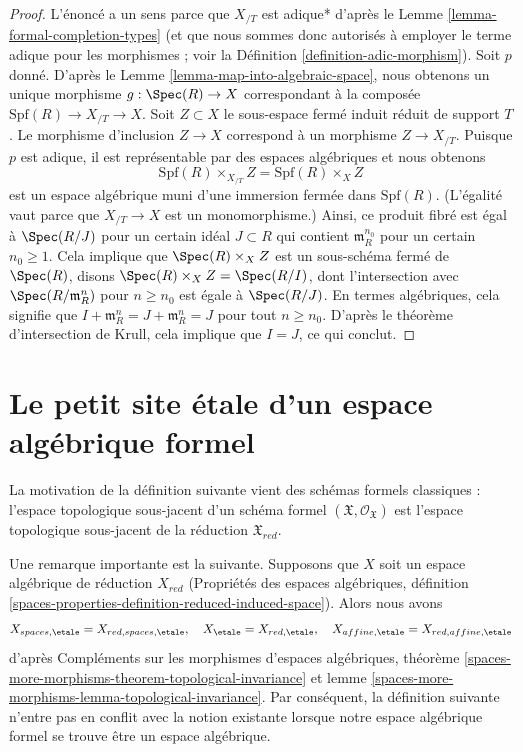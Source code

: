 \begin{proof}
L'énoncé a un sens parce que $X_{/T}$ est adique* d'après le
Lemme \ref{lemma-formal-completion-types} (et que nous sommes donc
autorisés à employer le terme adique pour les morphismes ; voir la
Définition \ref{definition-adic-morphism}).
Soit $p$ donné. D'après le Lemme \ref{lemma-map-into-algebraic-space},
nous obtenons un unique morphisme $g : \Spec(R) \to X$ correspondant à
la composée $\text{Spf}(R) \to X_{/T} \to X$.
Soit $Z \subset X$ le sous-espace fermé induit réduit de support
$T$. Le morphisme d'inclusion $Z \to X$ correspond à un morphisme
$Z \to X_{/T}$. Puisque $p$ est adique, il est représentable par des espaces
algébriques et nous obtenons
$$
\text{Spf}(R) \times_{X_{/T}} Z = \text{Spf}(R) \times_X Z
$$
est un espace algébrique muni d'une immersion fermée dans $\text{Spf}(R)$.
(L'égalité vaut parce que $X_{/T} \to X$ est un monomorphisme.)
Ainsi, ce produit fibré est égal à $\Spec(R/J)$ pour un certain
idéal $J \subset R$ qui contient $\mathfrak m_R^{n_0}$ pour un certain
$n_0 \geq 1$. Cela implique que $\Spec(R) \times_X Z$
est un sous-schéma fermé de $\Spec(R)$,
disons $\Spec(R) \times_X Z = \Spec(R/I)$, dont l'intersection avec
$\Spec(R/\mathfrak m_R^n)$ pour $n \geq n_0$ est égale à $\Spec(R/J)$.
En termes algébriques, cela signifie que
$I + \mathfrak m_R^n = J + \mathfrak m_R^n = J$ pour tout $n \geq n_0$.
D'après le théorème d'intersection de Krull,
cela implique que $I = J$, ce qui conclut.
\end{proof}








\section{Le petit site \'etale d'un espace algébrique formel}
\label{section-etale-sites}

\noindent
La motivation de la définition suivante vient des schémas
formels classiques : l'espace topologique sous-jacent d'un schéma formel
$(\mathfrak X, \mathcal{O}_\mathfrak X)$
est l'espace topologique sous-jacent de la réduction $\mathfrak X_{red}$.

\medskip\noindent
Une remarque importante est la suivante. Supposons que $X$ soit un espace algébrique
de réduction $X_{red}$ (Propriétés des espaces algébriques, définition
\ref{spaces-properties-definition-reduced-induced-space}).
Alors nous avons
$$
X_{spaces, \etale} = X_{red, spaces, \etale},\quad
X_\etale = X_{red, \etale},\quad
X_{affine, \etale} = X_{red, affine, \etale}
$$
d'après Compléments sur les morphismes d'espaces algébriques, théorème
\ref{spaces-more-morphisms-theorem-topological-invariance} et
lemme \ref{spaces-more-morphisms-lemma-topological-invariance}.
Par conséquent, la définition suivante n'entre pas en conflit avec la notion
existante lorsque notre espace algébrique formel se trouve être
un espace algébrique.

